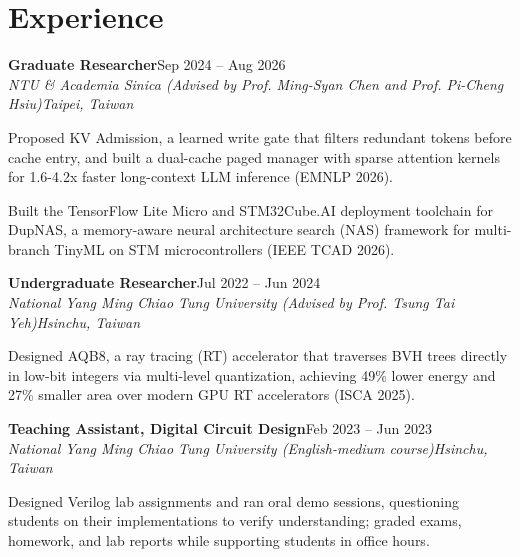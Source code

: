 \documentclass[a4paper,11pt]{article}
\newlength{\blocksep}     \setlength{\blocksep}{4pt}     %
\newcommand{\lrline}[2]{#1\hfill#2}
\newcommand{\resumeSubheading}[4]{%
  \item \lrline{\textbf{#1}}{#2}\\
        \lrline{\textit{\small #3}}{\textit{\small #4}}}
\newcommand{\resumeItemPlain}[1]{\item \small #1}
\newcommand{\subnote}[1]{{\footnotesize\textup{\textcolor[gray]{0.45}{(#1)}}}}
\begin{document}
\section{Experience}
  \begin{entries}[itemsep=\blocksep]

    \resumeSubheading
      {Graduate Researcher}{Sep 2024 -- Aug 2026}
      {NTU \& Academia Sinica \subnote{Advised by Prof. Ming-Syan Chen and Prof. Pi-Cheng Hsiu}}{Taipei, Taiwan}
      \begin{bullets}
        \resumeItemPlain{Proposed KV Admission, a learned write gate that filters redundant tokens before cache entry, and built a dual-cache paged manager with sparse attention kernels for 1.6-4.2x faster long-context LLM inference (EMNLP 2026).}
        \resumeItemPlain{Built the TensorFlow Lite Micro and STM32Cube.AI deployment toolchain for DupNAS, a memory-aware neural architecture search (NAS) framework for multi-branch TinyML on STM microcontrollers (IEEE TCAD 2026).}
      \end{bullets}

    \resumeSubheading
      {Undergraduate Researcher}{Jul 2022 -- Jun 2024}
      {National Yang Ming Chiao Tung University \subnote{Advised by Prof. Tsung Tai Yeh}}{Hsinchu, Taiwan}
      \begin{bullets}
        \resumeItemPlain{Designed AQB8, a ray tracing (RT) accelerator that traverses BVH trees directly in low-bit integers via multi-level quantization, achieving 49\% lower energy and 27\% smaller area over modern GPU RT accelerators (ISCA 2025).}
      \end{bullets}

    \resumeSubheading
      {Teaching Assistant, Digital Circuit Design}{Feb 2023 -- Jun 2023}
      {National Yang Ming Chiao Tung University \subnote{English-medium course}}{Hsinchu, Taiwan}
      \begin{bullets}
        \resumeItemPlain{Designed Verilog lab assignments and ran oral demo sessions, questioning students on their implementations to verify understanding; graded exams, homework, and lab reports while supporting students in office hours.}
      \end{bullets}

  \end{entries}

\end{document}

